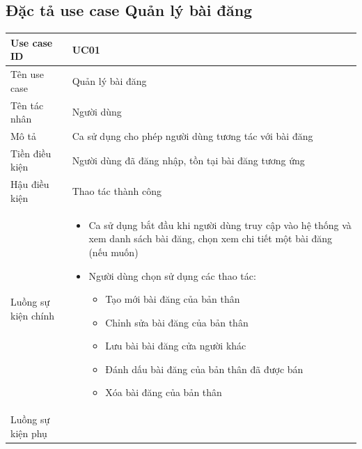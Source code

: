 \documentclass[../DoAn.tex]{subfiles}
\begin{document}
\subsection{Đặc tả use case Quản lý bài đăng
}
\hfill
\begin{table}[H]
\begin{tabular}{|p{3cm}|p{12cm}|}
\hline
Use case ID         & UC01                                                                                                               \\ \hline
Tên use case        & Quản lý bài đăng                                                                                                   \\ \hline
Tên tác nhân        & Người dùng                                                                                                         \\ \hline
Mô tả               & Ca sử dụng cho phép người dùng tương tác với bài đăng                                                              \\ \hline
Tiền điều kiện      & Người dùng đã đăng nhập, tồn tại bài đăng tương ứng                                                                                                              \\ \hline
Hậu điều kiện       & Thao tác thành công                                                                                                              \\ \hline
Luồng sự kiện chính & 
\begin{itemize}
\item Ca sử dụng bắt đầu khi người dùng truy cập vào hệ thống và xem danh sách bài đăng, chọn xem chi tiết một bài đăng (nếu muốn)
\item Người dùng chọn sử dụng các thao tác:
\begin{itemize}
\item Tạo mới bài đăng của bản thân
\item Chỉnh sửa bài đăng của bản thân
\item Lưu bài bài đăng cửa người khác
\item Đánh dấu bài đăng của bản thân đã được bán
\item Xóa bài đăng của bản thân
\end{itemize}
\end{itemize} \\\hline
Luồng sự kiện phụ   &                                      \begin{itemize}

\end{itemize}
\end{tabular}
\end{table}
\end{document}
